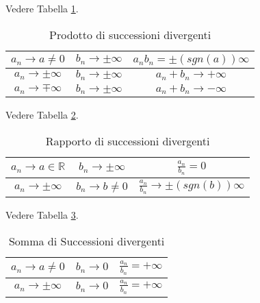 \begin{property}
    Vedere Tabella \ref{tab:prodotto_successioni_divergenti}.
    \begin{table}[!hbt]
        \centering
        \begin{tabular}{|c|c|c|}
            \hline
            $a_n\rightarrow a\neq 0$ & $b_n\rightarrow\pm\infty$ & $a_nb_n = \pm(sgn(a))\infty$\\
            \hline
            $a_n \rightarrow\pm\infty$ & $b_n\rightarrow\pm\infty$ & $a_n+b_n\rightarrow+\infty$\\
            \hline
            $a_n \rightarrow\mp\infty$ & $b_n\rightarrow\pm\infty$ & $a_n+b_n\rightarrow-\infty$\\
            \hline
        \end{tabular}
        \caption{Prodotto di successioni divergenti}
        \label{tab:prodotto_successioni_divergenti}
    \end{table}
\end{property}

\begin{property}
    Vedere Tabella \ref{tab:rapporto_successioni_divergenti}.
    \begin{table}[!hbt]
        \centering
        \begin{tabular}{|c|c|c|}
            \hline
            $a_n\rightarrow a\in\mathbb R$ & $b_n\rightarrow\pm\infty$ & $\frac{a_n}{b_n}=0$\\
            \hline
            $a_n \rightarrow\pm\infty$ & $b_n\rightarrow b\neq 0$ & $\frac{a_n}{b_n}\rightarrow \pm(sgn(b))\infty$\\
            \hline
        \end{tabular}
        \caption{Rapporto di successioni divergenti}
        \label{tab:rapporto_successioni_divergenti}
    \end{table}
\end{property}

\begin{property}
    Vedere Tabella \ref{tab:proprieta_successioni_divergenti}.
    \begin{table}[!hbt]
        \centering
        \begin{tabular}{|c|c|c|}
            \hline
            $a_n\rightarrow a\neq 0$ & $b_n\rightarrow 0$ & $\frac{a_n}{b_n} = +\infty$\\
            \hline
            $a_n \rightarrow\pm\infty$ & $b_n\rightarrow 0$ & $\frac{a_n}{b_n} = +\infty$\\
            \hline
        \end{tabular}
        \caption{Somma di Successioni divergenti}
        \label{tab:proprieta_successioni_divergenti}
    \end{table}
\end{property}


